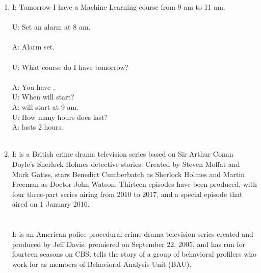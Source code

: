 \documentclass[letterpaper,12pt, dvipsnames, dateno]{article}
\begin{document}
\begin{enumerate}[label=\textbf{\arabic*}]
    \item{
         I: Tomorrow I have a Machine Learning course from 9 am to 11 am. \\ \\
         U: Set an alarm at 8 am. \\ \\
         A: Alarm set. \\ \\
         U: What course do I have tomorrow? \\ \\
         A: You have . \\
         
         U: When will  start? \\
         A:  will start at 9 am. \\
         U: How many hours does  last? \\
         A:  lasts 2 hours.
    }
    \\ \\
    \item{
        I:  is a British crime drama television series based on Sir Arthur Conan Doyle's Sherlock Holmes detective stories. Created by Steven Moffat and Mark Gatiss,  stars Benedict Cumberbatch as Sherlock Holmes and Martin Freeman as Doctor John Watson. Thirteen episodes have been produced, with four three-part series airing from 2010 to 2017, and a special episode that aired on 1 January 2016. \\ \\ \\
        I:  is an American police procedural crime drama television series created and produced by Jeff Davis.  premiered on September 22, 2005, and has run for fourteen seasons on CBS.  tells the story of a group of behavioral profilers who work for  as members of  Behavioral Analysis Unit (BAU). \\ \\ \\
}
\end{enumerate}
\end{document}

